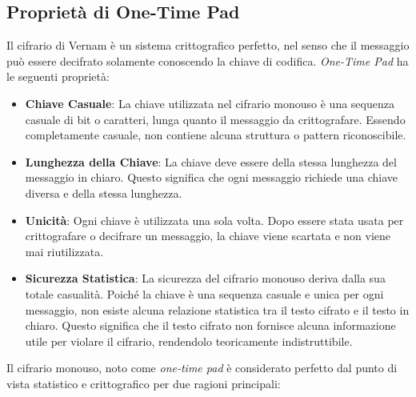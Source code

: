 \subsection{Proprietà di One-Time Pad}
Il cifrario di Vernam è un sistema crittografico perfetto, nel senso che il messaggio può essere
decifrato solamente conoscendo la chiave di codifica. \textit{One-Time Pad} ha le seguenti proprietà:
\begin{itemize}
    \item \textbf{Chiave Casuale}: La chiave utilizzata nel cifrario monouso è una sequenza 
    casuale di bit o caratteri, lunga quanto il messaggio da crittografare. Essendo completamente casuale, 
    non contiene alcuna struttura o pattern riconoscibile.
    
    \item \textbf{Lunghezza della Chiave}: La chiave deve essere della stessa lunghezza del messaggio 
    in chiaro. Questo significa che ogni messaggio richiede una chiave diversa e della stessa lunghezza.
    
    \item \textbf{Unicità}: Ogni chiave è utilizzata una sola volta. Dopo essere stata usata per crittografare
    o decifrare un messaggio, la chiave viene scartata e non viene mai riutilizzata.
    
    \item \textbf{Sicurezza Statistica}: La sicurezza del cifrario monouso deriva dalla sua totale casualità.
    Poiché la chiave è una sequenza casuale e unica per ogni messaggio, non esiste alcuna relazione statistica
    tra il testo cifrato e il testo in chiaro. Questo significa che il testo cifrato non fornisce alcuna
    informazione utile per violare il cifrario, rendendolo teoricamente indistruttibile.
\end{itemize}
Il cifrario monouso, noto come \textit{one-time pad} è considerato perfetto dal punto di vista statistico
e crittografico per due ragioni principali:

